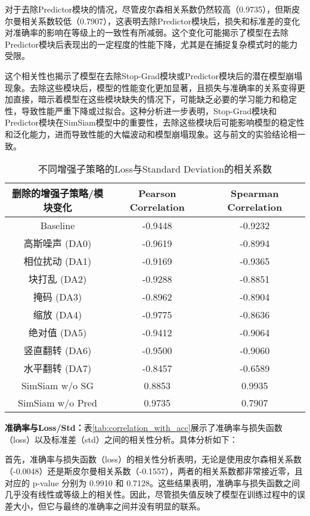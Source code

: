 \documentclass[master]{thesis-uestc}
\begin{document}
对于去除Predictor模块的情况，尽管皮尔森相关系数仍然较高（0.9735），但斯皮尔曼相关系数较低（0.7907），这表明去除Predictor模块后，损失和标准差的变化对准确率的影响在等级上的一致性有所减弱。这个变化可能揭示了模型在去除Predictor模块后表现出的一定程度的性能下降，尤其是在捕捉复杂模式时的能力受限。

这个相关性也揭示了模型在去除Stop-Grad模块或Predictor模块后的潜在模型崩塌现象。去除这些模块后，模型的性能变化更加显著，且损失与准确率的关系变得更加直接，暗示着模型在这些模块缺失的情况下，可能缺乏必要的学习能力和稳定性，导致性能严重下降或过拟合。这种分析进一步表明，Stop-Grad模块和Predictor模块在SimSiam模型中的重要性，去除这些模块后可能影响模型的稳定性和泛化能力，进而导致性能的大幅波动和模型崩塌现象。这与前文的实验结论相一致。

\begin{table}
    \centering
    \caption{不同增强子策略的Loss与Standard Deviation的相关系数}
    \begin{tabular}{ccc}
        \hline
        \textbf{删除的增强子策略/模块变化} & \textbf{Pearson Correlation} & \textbf{Spearman Correlation} \\
        \hline
        Baseline & -0.9448 & -0.9232 \\
        高斯噪声 (DA0)  & -0.9619 & -0.8994 \\
        相位扰动 (DA1)  & -0.9169 & -0.9365 \\
        块打乱 (DA2)  & -0.9288 & -0.8851 \\
        掩码 (DA3)  & -0.8962 & -0.8904 \\
        缩放 (DA4)  & -0.9775 & -0.8636 \\
        绝对值 (DA5)  & -0.9412 & -0.9064 \\
        竖直翻转 (DA6)  & -0.9500 & -0.9060 \\
        水平翻转 (DA7)  & -0.8457 & -0.6589 \\
        SimSiam w/o SG & 0.8853 & 0.9935 \\
        SimSiam w/o Pred & 0.9735 & 0.7907 \\
        \hline
    \end{tabular}
    \label{tb:correlation_with_loss_std}
\end{table}

\textbf{准确率与Loss/Std：}表\ref{tab:correlation_with_acc}展示了准确率与损失函数（loss）以及标准差（std）之间的相关性分析。具体分析如下：

首先，准确率与损失函数（loss）的相关性分析表明，无论是使用皮尔森相关系数（-0.0048）还是斯皮尔曼相关系数（-0.1557），两者的相关系数都非常接近零，且对应的 p-value 分别为 0.9910 和 0.7128。这些结果表明，准确率与损失函数之间几乎没有线性或等级上的相关性。因此，尽管损失值反映了模型在训练过程中的误差大小，但它与最终的准确率之间并没有明显的联系。
\end{document}
